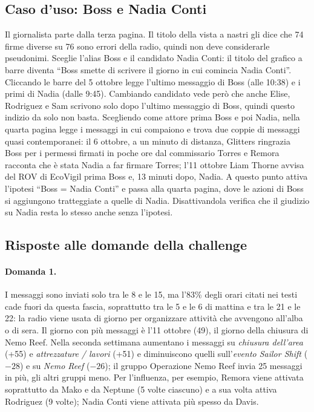 \documentclass[11pt,a4paper]{article}
\begin{document}
\subsection{Caso d'uso: Boss e Nadia Conti}
Il giornalista parte dalla terza pagina. Il titolo della vista a nastri gli dice che 74 firme diverse su 76
sono errori della radio, quindi non deve considerarle pseudonimi. Sceglie l'alias Boss e il candidato Nadia
Conti: il titolo del grafico a barre diventa ``Boss smette di scrivere il giorno in cui comincia Nadia Conti''.
Cliccando le barre del 5 ottobre legge l'ultimo messaggio di Boss (alle 10:38) e i primi di Nadia (dalle 9:45).
Cambiando candidato vede però che anche Elise, Rodriguez e Sam scrivono solo dopo l'ultimo messaggio di Boss,
quindi questo indizio da solo non basta. Scegliendo come attore prima Boss e poi Nadia, nella quarta pagina
legge i messaggi in cui compaiono e trova due coppie di messaggi quasi contemporanei: il 6 ottobre, a un minuto di distanza, Glitters ringrazia Boss per i permessi firmati in poche ore
dal commissario Torres e Remora racconta che è stata Nadia a far firmare Torres; l'11 ottobre Liam Thorne avvisa
del ROV di EcoVigil prima Boss e, 13 minuti dopo, Nadia. A questo punto attiva l'ipotesi ``Boss = Nadia Conti''
e passa alla quarta pagina, dove le azioni di Boss si aggiungono tratteggiate a quelle di Nadia. Disattivandola
verifica che il giudizio su Nadia resta lo stesso anche senza l'ipotesi.

\subsection{Risposte alle domande della challenge}\label{sec:risposte}
\paragraph{Domanda 1.} I messaggi sono inviati solo tra le 8 e le 15, ma l'83\% degli orari citati nei testi
cade fuori da questa fascia, soprattutto tra le 5 e le 6 di mattina e tra le 21 e le 22: la radio viene usata di
giorno per organizzare attività che avvengono all'alba o di sera. Il giorno con più messaggi è l'11 ottobre (49),
il giorno della chiusura di Nemo Reef. Nella seconda settimana aumentano i messaggi su \emph{chiusura dell'area}
(+55) e \emph{attrezzature / lavori} (+51) e diminuiscono quelli sull'\emph{evento Sailor Shift} ($-28$) e su
\emph{Nemo Reef} ($-26$); il gruppo Operazione Nemo Reef invia 25 messaggi in più, gli altri gruppi meno. Per
l'influenza, per esempio, Remora viene attivata soprattutto da Mako e da Neptune (5 volte ciascuno) e a sua volta attiva Rodriguez
(9 volte); Nadia Conti viene attivata più spesso da Davis.
\end{document}

